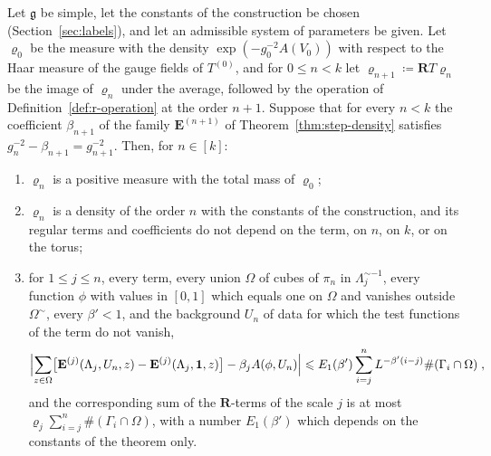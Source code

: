 \documentclass[11pt]{preprint}
\newcommand{\id}{\mathbf 1}
\numberwithin{equation}{section}
\begin{document}
\begin{theorem}\label{thm:inductive}
Let $\mathfrak g$ be simple, let the constants of the construction be chosen (Section~\ref{sec:labels}), and let an admissible system of parameters be given. Let $\varrho_0$ be the measure with the density $\exp(-g_0^{-2}A(V_0))$ with respect to the Haar measure of the gauge fields of $T^{(0)}$, and for $0 \leqslant n < k$ let $\varrho_{n+1} \coloneqq \mathbf RT\varrho_n$ be the image of $\varrho_n$ under the average, followed by the operation of Definition~\ref{def:r-operation} at the order $n + 1$. Suppose that for every $n < k$ the coefficient $\beta_{n+1}$ of the family $\mathbf E^{(n+1)}$ of Theorem~\ref{thm:step-density} satisfies $g_n^{-2} - \beta_{n+1} = g_{n+1}^{-2}$. Then, for $n \in [k]$:
\begin{enumerate}[label=(\roman*)]
\item $\varrho_n$ is a positive measure with the total mass of $\varrho_0$;
\item $\varrho_n$ is a density of the order $n$ with the constants of the construction, and its regular terms and coefficients do not depend on the term, on $n$, on $k$, or on the torus;
\item for $1 \leqslant j \leqslant n$, every term, every union $\Omega$ of cubes of $\pi_n$ in $\Lambda_j^{\sim-1}$, every function $\phi$ with values in $[0, 1]$ which equals one on $\Omega$ and vanishes outside $\Omega^\sim$, every $\beta' < 1$, and the background $U_n$ of data for which the test functions of the term do not vanish,
\begin{equation}\label{eq:theorem-two}
    \Bigl\lvert\sum_{z \in \Omega}\bigl[\mathbf E^{(j)}(\Lambda_j, U_n, z) - \mathbf E^{(j)}(\Lambda_j, \id, z)\bigr] - \beta_jA(\phi, U_n)\Bigr\rvert \leqslant E_1(\beta')\sum_{i=j}^{n}L^{-\beta'(i-j)}\#(\Gamma_i \cap \Omega)\;,
\end{equation}
and the corresponding sum of the $\mathbf R$-terms of the scale $j$ is at most $\varrho_j\sum_{i=j}^{n}\#(\Gamma_i \cap \Omega)$, with a number $E_1(\beta')$ which depends on the constants of the theorem only.
\end{enumerate}
\end{theorem}
\end{document}
